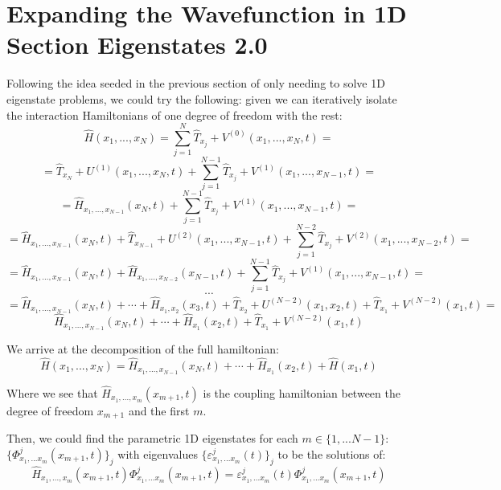 \documentclass[11pt, a4paper]{article} %
\begin{document}
\section{Expanding the Wavefunction in 1D Section Eigenstates 2.0}
Following the idea seeded in the previous section of only needing to solve 1D eigenstate problems, we could try the following: given we can iteratively isolate the interaction Hamiltonians of one degree of freedom with the rest:
\begin{equation}
\hat{H}(x_1,...,x_N)=\sum_{j=1}^N \hat{T}_{x_j} + V^{(0)}(x_1,...,x_N,t)=
\end{equation}
$$
=\hat{T}_{x_N} + U^{(1)}(x_1,...,x_N,t) + \sum_{j=1}^{N-1} \hat{T}_{x_j} + V^{(1)}(x_1,...,x_{N-1},t)=
$$
$$
=\hat{H}_{x_1,...,x_{N-1}}(x_N,t)+\sum_{j=1}^{N-1} \hat{T}_{x_j} + V^{(1)}(x_1,...,x_{N-1},t)=
$$
$$
=\hat{H}_{x_1,...,x_{N-1}}(x_N,t)+\hat{T}_{x_{N-1}} + U^{(2)}(x_1,...,x_{N-1},t) + \sum_{j=1}^{N-2} \hat{T}_{x_j} + V^{(2)}(x_1,...,x_{N-2},t)=
$$
$$
=\hat{H}_{x_1,...,x_{N-1}}(x_N,t)+\hat{H}_{x_1,...,x_{N-2}}(x_{N-1},t)+\sum_{j=1}^{N-1} \hat{T}_{x_j} + V^{(1)}(x_1,...,x_{N-1},t)=
$$
$$
\cdots
$$
$$
=\hat{H}_{x_1,...,x_{N-1}}(x_N,t)+\cdots+\hat{H}_{x_1,x_2}(x_3,t)+\hat{T}_{x_{2}} + U^{(N-2)}(x_1,x_2,t) + \hat{T}_{x_1} + V^{(N-2)}(x_1,t)= 
$$
$$
\hat{H}_{x_1,...,x_{N-1}}(x_N,t)+\cdots+\hat{H}_{x_1}(x_2,t)+ \hat{T}_{x_1} + V^{(N-2)}(x_1,t)
$$

We arrive at the decomposition of the full hamiltonian:
\begin{equation}
\hat{H}(x_1,...,x_N)=\hat{H}_{x_1,...,x_{N-1}}(x_N,t)+\cdots+\hat{H}_{x_1}(x_2,t)+ \hat{H}(x_1,t)
\end{equation}

Where we see that $\hat{H}_{x_1,...,x_{m}}(x_{m+1},t)$ is the coupling hamiltonian between the degree of freedom $x_{m+1}$ and the first $m$.

Then, we could find the parametric 1D eigenstates for each $m\in\{1,...N-1\}$: $\{\Phi^j_{x_1,...x_m}(x_{m+1},t)\}_j$ with eigenvalues $\{ \varepsilon^j_{x_1,...x_m}(t) \}_j$ to be the solutions of:
\begin{equation}
\hat{H}_{x_1,...,x_m}(x_{m+1},t)\Phi^j_{x_1,...x_m}(x_{m+1},t) =  \varepsilon^j_{x_1,...x_m}(t) \Phi^j_{x_1,...x_m}(x_{m+1},t)
\end{equation}
\end{document}
